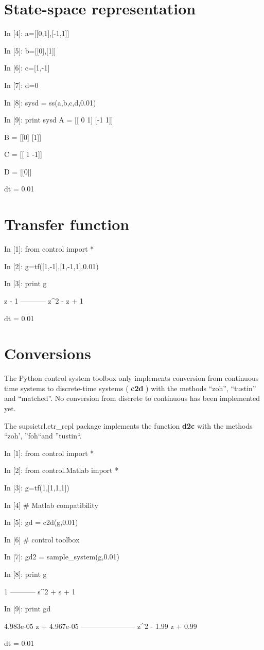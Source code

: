 \section{State-space representation}
\begin{code}
In [4]: a=[[0,1],[-1,1]]

In [5]: b=[[0],[1]]

In [6]: c=[1,-1]

In [7]: d=0

In [8]: sysd = ss(a,b,c,d,0.01)

In [9]: print sysd
A = [[ 0  1]
 [-1  1]]

B = [[0]
 [1]]

C = [[ 1 -1]]

D = [[0]]

dt = 0.01
\end{code}


\section{Transfer function}
\begin{code}
In [1]: from control import *

In [2]: g=tf([1,-1],[1,-1,1],0.01)

In [3]: print g

   z - 1
-----------
z^2 - z + 1

dt = 0.01
\end{code}

\section{Conversions}

The Python control system toolbox only implements conversion from continuous time systems to discrete-time systems ( \textbf{c2d} ) with the methods 
``zoh'', ``tustin'' and ``matched''. No conversion from discrete to continuous 
has been implemented yet.

The supsictrl.ctr\_repl package implements the function \textbf{d2c} with the methods ``zoh', ''foh``and ''tustin``.

\begin{code}
In [1]: from control import *

In [2]: from control.Matlab import *

In [3]: g=tf(1,[1,1,1])

In [4]  # Matlab compatibility 

In [5]: gd = c2d(g,0.01)             

In [6]  # control toolbox 

In [7]: gd2 = sample_system(g,0.01)  

In [8]: print g

     1
-----------
s^2 + s + 1


In [9]: print gd

4.983e-05 z + 4.967e-05
-----------------------
  z^2 - 1.99 z + 0.99

dt = 0.01
\end{code}

